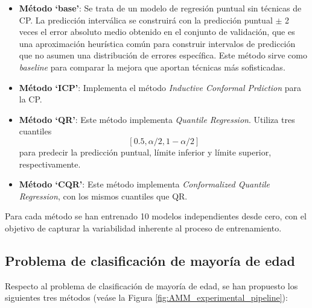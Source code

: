 \begin{itemize}

    \item \textbf{Método `base'}: Se trata de un modelo de regresión puntual sin técnicas de \acrshort{CP}. La predicción interválica se construirá con la predicción puntual $\pm$ 2 veces el error absoluto medio obtenido en el conjunto de validación, que es una aproximación heurística común para construir intervalos de predicción que no asumen una distribución de errores específica. Este método sirve como \textit{baseline} para comparar la mejora que aportan técnicas más sofisticadas.

    \item \textbf{Método `ICP'}: Implementa el método \textit{Inductive Conformal Prdiction} para la \acrshort{CP}. 
    
    \item \textbf{Método `QR'}: Este método implementa \textit{Quantile Regression}. Utiliza tres cuantiles 
    $$
    [0.5, \alpha/2, 1-\alpha/2]
    $$ 
    para predecir la predicción puntual, límite inferior y límite superior, respectivamente.

    \item \textbf{Método `CQR'}: Este método implementa \textit{Conformalized Quantile Regression}, con los mismos cuantiles que \acrshort{QR}. 

\end{itemize} 

Para cada método se han entrenado 10 modelos independientes desde cero, con el objetivo de capturar la variabilidad inherente al proceso de entrenamiento.



\subsection{Problema de clasificación de mayoría de edad}

Respecto al problema de clasificación de mayoría de edad, se han propuesto los siguientes tres métodos (veáse la Figura \ref{fig:AMM_experimental_pipeline}): 

